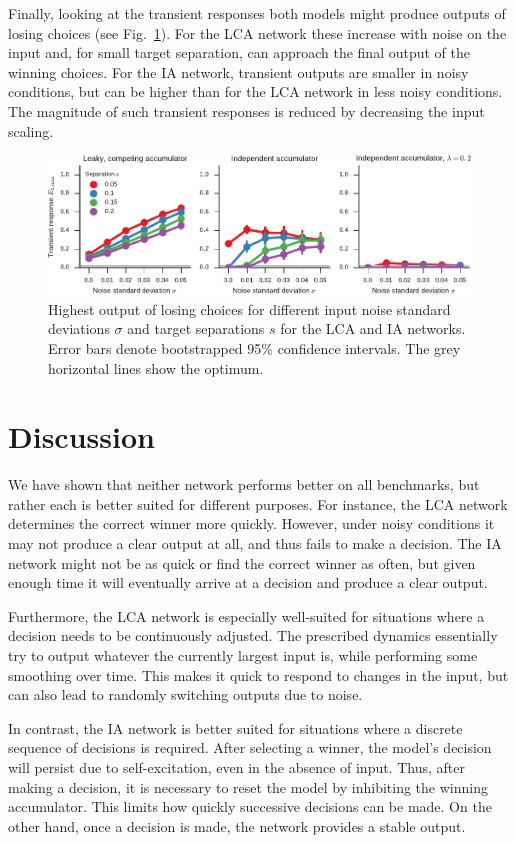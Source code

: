 \documentclass[10pt,letterpaper]{article}
\begin{document}
Finally, looking at the transient responses both models might produce outputs of losing choices (see Fig.~\ref{fig:transient}).
For the LCA network these increase with noise on the input and, for small target separation, can approach the final output of the winning choices.
For the IA network, transient outputs are smaller in noisy conditions, but can be higher than for the LCA network in less noisy conditions.
The magnitude of such transient responses is reduced by decreasing the input scaling.
\begin{figure}
    \centering
    \includegraphics{figures/transient}
    \caption{ \label{fig:transient}
        Highest output of losing choices for different input noise standard deviations $\sigma$ and target separations $s$ for the LCA and IA networks.
        Error bars denote bootstrapped 95\% confidence intervals.
        The grey horizontal lines show the optimum.
    }
\end{figure}

\section{Discussion}
We have shown that neither network performs better on all benchmarks, but rather each is better suited for different purposes.
For instance, the LCA network determines the correct winner more quickly.
However, under noisy conditions it may not produce a clear output at all, and thus fails to make a decision.
The IA network might not be as quick or find the correct winner as often, but given enough time it will eventually arrive at a decision and produce a clear output.

Furthermore, the LCA network is especially well-suited for situations where a decision needs to be continuously adjusted.
The prescribed dynamics essentially try to output whatever the currently largest input is, while performing some smoothing over time.
This makes it quick to respond to changes in the input, but can also lead to randomly switching outputs due to noise.

In contrast, the IA network is better suited for situations where a discrete sequence of decisions is required.
After selecting a winner, the model's decision will persist due to self-excitation, even in the absence of input.
Thus, after making a decision, it is necessary to reset the model by inhibiting the winning accumulator.
This limits how quickly successive decisions can be made.
On the other hand, once a decision is made, the network provides a stable output.
\end{document}
